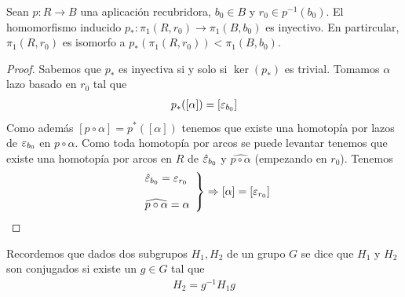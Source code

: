 \begin{teo}
    Sean $p:R \to B$ una aplicación recubridora, $b_0\in B$ y $r_0\in p^{-1}(b_0)$. El homomorfismo inducido $p_*:\pi_1(R,r_0)\to \pi_1(B,b_0)$ es inyectivo. En partircular, $\pi_1(R,r_0)$ es isomorfo a $p_*(\pi_1(R,r_0))< \pi_1(B,b_0)$.

    \begin{proof}
        Sabemos que $p_*$ es inyectiva si y solo si $\ker(p_*)$ es trivial. Tomamos $\alpha$ lazo basado en $r_0$ tal que 
        \begin{gather*}
            p_*([\alpha]) = [\varepsilon_{b_0}]
        \end{gather*}
        Como además $[p\circ \alpha] = p^*([\alpha])$ tenemos que existe una homotopía por lazos de $\varepsilon_{b_0}$ en $p\circ \alpha$. Como toda homotopía por arcos se puede levantar tenemos que existe una homotopía por arcos en $R$ de $\hat{\varepsilon}_{b_0}$ y $\widehat{p\circ \alpha}$ (empezando en $r_0$). Tenemos
        \begin{gather*}
            \left.
            \begin{array}{l}
                \hat{\varepsilon}_{b_0} = \varepsilon_{r_0}\\\\
                \widehat{p\circ \alpha} = \alpha
            \end{array}
            \right\}  \Rightarrow [\alpha] = [\varepsilon_{r_0}]
        \end{gather*}
    \end{proof}
\end{teo}

\begin{observacion}
    Recordemos que dados dos subgrupos $H_1,H_2$ de un grupo $G$ se dice que $H_1$ y $H_2$ son conjugados si existe un $g\in G$ tal que 
    \begin{gather*}
        H_2=g^{-1}H_1 g
    \end{gather*}
\end{observacion}

